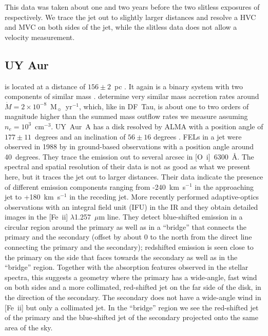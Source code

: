 \documentclass[twocolumn]{aastex62}
\begin{document}
This data was taken about one and two years before the two slitless exposures of \citet{2004ApJ...609..261H} respectively. We trace the jet out to slightly larger distances and resolve a HVC and MVC on both sides of the jet, while the slitless data does not allow a velocity measurement.


\subsection{UY Aur}

 is  located at a distance of $156\pm2$~pc
\citep{2016A&A...595A...1G,2018A&A...616A...1G}. It again is a binary system
with two components of similar mass \citep[M0 and M2,
  see][]{2003ApJ...583..334H}. \citet{2003ApJ...583..334H} determine very
similar mass accretion rates around
$\dot M=2\times10^{-8}$~M$_{\sun}$~yr$^{-1}$, which, like in DF~Tau, is about
one to two orders of magnitude higher than the summed mass outflow rates we
measure assuming $n_e=10^3$~cm$^{-3}$.
UY~Aur~A has a disk resolved by ALMA with a position angle of $177\pm11$~degrees and an inclination of $56\pm16$ degrees \citep{2014ApJ...784...62A}. FELs in a jet were observed in 1988 by \citet{1997A&AS..126..437H} in ground-based observations with a position angle around 40~degrees. They trace the emission out to several arcsec in [O~{\sc i}]~6300~\AA{}. The spectral and spatial resolution of their data is not as good as what we present here, but it traces the jet out to larger distances. Their data indicate the presence of different emission components ranging from -240~km~s$^{-1}$ in the approaching jet to +180~km~s$^{-1}$ in the receding jet. More recently \citet{2014ApJ...786...63P} performed adaptive-optics observations with an integral field unit (IFU) in the IR and they obtain detailed images in the [Fe~{\sc ii}] $\lambda$1.257~$\mu$m line. They detect blue-shifted emission in a circular region around the primary as well as in a ``bridge'' that connects the primary and the secondary (offset by about 0 to the north from the direct line connecting the primary and the secondary); redshifted emission is seen close to the primary on the side that faces towards the secondary as well as in the ``bridge'' region. Together with the absorption features observed in the stellar spectra, this suggests a geometry where the primary has a wide-angle, fast wind on both sides and a more collimated, red-shifted jet on the far side of the disk, in the direction of the secondary. The secondary does not have a wide-angle wind in [Fe~{\sc ii}] but only a collimated jet. In the ``bridge'' region we see the red-shifted jet of the primary and the blue-shifted jet of the secondary projected onto the same area of the sky.
\end{document}
